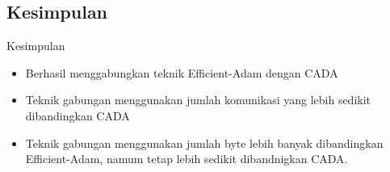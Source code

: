 \subsection{Kesimpulan}
\begin{frame}{Kesimpulan}
  \begin{itemize}
    \item Berhasil menggabungkan teknik Efficient-Adam dengan CADA
    \item Teknik gabungan menggunakan jumlah komunikasi yang lebih sedikit dibandingkan CADA
    \item Teknik gabungan menggunakan jumlah byte lebih banyak dibandingkan Efficient-Adam, namum tetap lebih sedikit dibandnigkan CADA.
  \end{itemize}
\end{frame}
